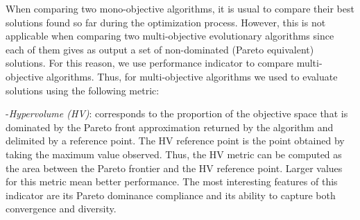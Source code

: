 When comparing two mono-objective algorithms, it is usual to compare their best solutions found so far during the optimization process. However, this is not applicable when comparing two multi-objective evolutionary algorithms since each of them gives as output a set of non-dominated (Pareto equivalent) solutions. For this reason, we use performance indicator to compare multi-objective algorithms.
Thus, for multi-objective algorithms we used to evaluate solutions using the following metric:

-\textit{Hypervolume (HV)}: corresponds to the proportion of the objective space that is dominated by the Pareto front approximation returned by the algorithm and delimited by a reference point. The HV reference point is the point obtained by taking the maximum value observed. Thus, the HV metric can be computed as the area between the Pareto frontier and the HV reference point. Larger values for this metric mean better performance. The most interesting features of this indicator are its Pareto dominance compliance and its ability to capture both convergence and diversity\cite{deb2001multi}. 

